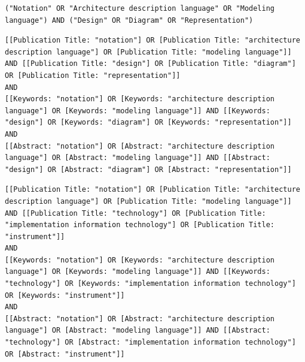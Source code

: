 \begin{tcolorbox}[
	colback=gray!5,
	colframe=black!60,
	title=Cadena de búsqueda en ScienceDirect para ``Diseño'',
	fonttitle=\bfseries,
	sharp corners=south
]
\scriptsize
\begin{lstlisting}[breaklines=true]
("Notation" OR "Architecture description language" OR "Modeling language") AND ("Design" OR "Diagram" OR "Representation")
\end{lstlisting}
\end{tcolorbox}

\begin{tcolorbox}[
	colback=gray!5,
	colframe=black!60,
	title=Cadena de búsqueda en Taylor \& Francis para ``Metodología'',
	fonttitle=\bfseries,
	sharp corners=south
]
\scriptsize
\begin{lstlisting}[breaklines=true]
[[Publication Title: "notation"] OR [Publication Title: "architecture description language"] OR [Publication Title: "modeling language"]] AND [[Publication Title: "design"] OR [Publication Title: "diagram"] OR [Publication Title: "representation"]] 
AND 
[[Keywords: "notation"] OR [Keywords: "architecture description language"] OR [Keywords: "modeling language"]] AND [[Keywords: "design"] OR [Keywords: "diagram"] OR [Keywords: "representation"]] 
AND 
[[Abstract: "notation"] OR [Abstract: "architecture description language"] OR [Abstract: "modeling language"]] AND [[Abstract: "design"] OR [Abstract: "diagram"] OR [Abstract: "representation"]]
\end{lstlisting}
\end{tcolorbox}

\begin{tcolorbox}[
	colback=gray!5,
	colframe=black!60,
	title=Cadena de búsqueda en Taylor \& Francis para ``Tecnología'',
	fonttitle=\bfseries,
	sharp corners=south
]
\scriptsize
\begin{lstlisting}[breaklines=true]
[[Publication Title: "notation"] OR [Publication Title: "architecture description language"] OR [Publication Title: "modeling language"]] AND [[Publication Title: "technology"] OR [Publication Title: "implementation information technology"] OR [Publication Title: "instrument"]] 
AND
[[Keywords: "notation"] OR [Keywords: "architecture description language"] OR [Keywords: "modeling language"]] AND [[Keywords: "technology"] OR [Keywords: "implementation information technology"] OR [Keywords: "instrument"]] 
AND
[[Abstract: "notation"] OR [Abstract: "architecture description language"] OR [Abstract: "modeling language"]] AND [[Abstract: "technology"] OR [Abstract: "implementation information technology"] OR [Abstract: "instrument"]]
\end{lstlisting}
\end{tcolorbox}

